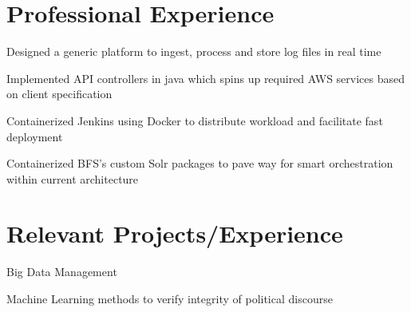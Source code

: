 \documentclass[]{resume_openfont}
\begin{document}
\begin{minipage}[t]{0.66\textwidth} 


\section{Professional Experience}

\vspace{\topsep} %
\begin{tightemize}
\item Designed a generic platform to ingest, process and store log files in real time
\item Implemented API controllers in java which spins up required AWS services based on client specification
\end{tightemize}
\sectionsep

\begin{tightemize}
\item Containerized Jenkins using Docker to distribute workload and facilitate fast deployment
\item Containerized BFS’s custom Solr packages to pave way for smart orchestration within current architecture
\end{tightemize}
\sectionsep


\section{Relevant Projects/Experience}

\begin{tightemize}
\item Big Data Management
\item Machine Learning methods to verify integrity of political discourse
\end{tightemize}
\sectionsep


\end{minipage}
\end{document}
